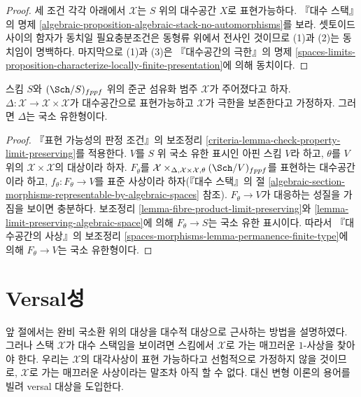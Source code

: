 \begin{proof}
세 조건 각각 아래에서 $\mathcal{X}$는 $S$ 위의 대수공간 $X$로
표현가능하다. 『대수 스택』의 명제
\ref{algebraic-proposition-algebraic-stack-no-automorphisms}를 보라.
셋토이드 사이의 함자가 동치일 필요충분조건은 동형류 위에서 전사인
것이므로 (1)과 (2)는 동치임이 명백하다. 마지막으로 (1)과 (3)은
『대수공간의 극한』의 명제
\ref{spaces-limits-proposition-characterize-locally-finite-presentation}에
의해 동치이다.
\end{proof}

\begin{lemma}
\label{lemma-diagonal}
스킴 $S$와 $(\Sch/S)_{fppf}$ 위의 준군 섬유화 범주 $\mathcal{X}$가
주어졌다고 하자. $\Delta : \mathcal{X} \to \mathcal{X} \times \mathcal{X}$가
대수공간으로 표현가능하고 $\mathcal{X}$가 극한을 보존한다고 가정하자.
그러면 $\Delta$는 국소 유한형이다.
\end{lemma}

\begin{proof}
『표현 가능성의 판정 조건』의 보조정리
\ref{criteria-lemma-check-property-limit-preserving}를 적용한다.
$V$를 $S$ 위 국소 유한 표시인 아핀 스킴 $V$라 하고,
$\theta$를 $V$ 위의 $\mathcal{X} \times \mathcal{X}$의 대상이라 하자.
$F_\theta$를
$\mathcal{X} \times_{\Delta, \mathcal{X} \times \mathcal{X}, \theta}
(\Sch/V)_{fppf}$를 표현하는 대수공간이라 하고,
$f_\theta : F_\theta \to V$를 표준 사상이라 하자(『대수 스택』의 절
\ref{algebraic-section-morphisms-representable-by-algebraic-spaces} 참조).
$F_\theta \to V$가 대응하는 성질을 가짐을 보이면 충분하다.
보조정리 \ref{lemma-fibre-product-limit-preserving}와
\ref{lemma-limit-preserving-algebraic-space}에 의해
$F_\theta \to S$는 국소 유한 표시이다. 따라서 『대수공간의 사상』의
보조정리 \ref{spaces-morphisms-lemma-permanence-finite-type}에 의해
$F_\theta \to V$는 국소 유한형이다.
\end{proof}






\section{Versal성}
\label{section-versality}

\noindent
앞 절에서는 완비 국소환 위의 대상을 대수적 대상으로 근사하는 방법을
설명하였다. 그러나 스택 $\mathcal{X}$가 대수 스택임을 보이려면 스킴에서
$\mathcal{X}$로 가는 매끄러운 $1$-사상을 찾아야 한다. 우리는 $\mathcal{X}$의
대각사상이 표현 가능하다고 선험적으로 가정하지 않을 것이므로,
$\mathcal{X}$로 가는 매끄러운 사상이라는 말조차 아직 할 수 없다. 대신
변형 이론의 용어를 빌려 versal 대상을 도입한다.

